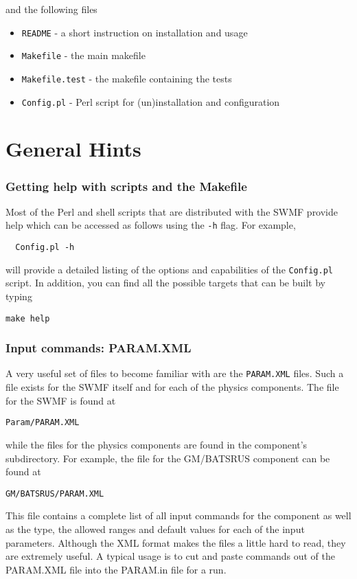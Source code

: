 and the following files
\begin{itemize}\itemsep=0pt
\item {\tt README}        - a short instruction on installation and usage
\item {\tt Makefile}      - the main makefile
\item {\tt Makefile.test} - the makefile containing the tests %
\item {\tt Config.pl}     - Perl script for (un)installation and configuration
\end{itemize}

\section{General Hints}

\subsubsection{Getting help with scripts and the Makefile}

Most of the Perl and shell scripts that are distributed with the SWMF
provide help which can be accessed as follows using the {\tt -h} flag.
For example, 
\begin{verbatim}
  Config.pl -h
\end{verbatim}
will provide a detailed listing of the options and capabilities of the
{\tt Config.pl} script.  In addition, you can find all the possible
targets  that can be built by typing
\begin{verbatim}
make help
\end{verbatim}

\subsubsection{Input commands: PARAM.XML}
A very useful set of files to become familiar with are the {\tt PARAM.XML}
files.  Such a file exists for the SWMF itself and for each of the
physics components.  The file for the SWMF is found at
\begin{verbatim}
Param/PARAM.XML
\end{verbatim}
while the files for the physics components are found in the component's
subdirectory.  For example, the file for the GM/BATSRUS component can
be found at
\begin{verbatim}
GM/BATSRUS/PARAM.XML
\end{verbatim}
This file contains a complete list of all input commands for the
component as well as the type, the allowed ranges and default values
for each of the input parameters.
Although the XML format makes the files a little hard to read, they are
extremely useful.  A typical usage is to cut and paste commands out of the
PARAM.XML file into the PARAM.in file for a run. 

